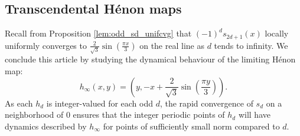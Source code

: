 \documentclass[12pt]{amsart}
\theoremstyle{definition}
\begin{document}
\subsection{Transcendental Hénon maps} \label{subsection:transc_henon}


Recall from Proposition \ref{lem:odd_sd_unifcvg} that $(-1)^d s_{2d+1}(x)$ locally uniformly converges to $\frac{2}{\sqrt{3}}\sin(\frac{\pi x}{3})$ on the real line as $d$ tends to infinity. We conclude this article by studying the dynamical behaviour of the limiting Hénon map:
$$ h_{\infty}(x,y) = \left(y, -x + \frac{2}{\sqrt{3}}\sin\left(\frac{\pi y}{3}\right)\right). $$
As each $h_{d}$ is integer-valued for each odd $d$, the rapid convergence of $s_d$ on a neighborhood of $0$ ensures that the integer periodic points of $h_d$ will have dynamics described by $h_{\infty}$ for points of sufficiently small norm compared to $d$.
\end{document}
